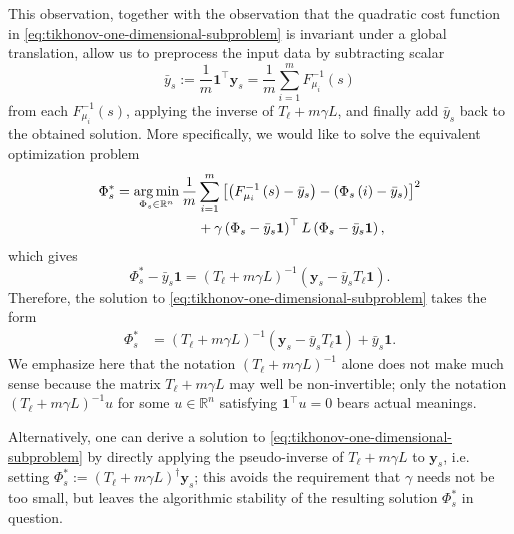 \documentclass[letterpaper]{article} %
\begin{document}
This observation, together with the observation that the quadratic cost function in \eqref{eq:tikhonov-one-dimensional-subproblem} is invariant under a global translation, allow us to preprocess the input data by subtracting scalar
\begin{equation}
  \label{eq:off-set-defn}
  \bar{y}_s := \frac{1}{m}\mathbf{1}^{\top}\mathbf{y}_s=\frac{1}{m}\sum_{i=1}^mF_{\mu_i}^{-1}\left( s \right)
\end{equation}
from each $F_{\mu_i}^{-1}\left( s \right)$, applying the inverse of $T_\ell+m\gamma L$, and finally add $\bar{y}_s$ back to the obtained solution. More specifically, we would like to solve the equivalent optimization problem
\begin{equation}
  \label{eq:tikhonov-one-dimensional-subproblem-equiv}
  \begin{aligned}
    \Phi_s^*=\mathop{\rm arg\, min}_{\Phi_s\in\mathbb{R}^n}\frac{1}{m}&\sum_{i=1}^m \left[\left( F_{\mu_i}^{-1}\left( s \right)-\bar{y}_s\right)-\left(\Phi_s \left( i \right)-\bar{y}_s \right)\right]^2\\
    &+\gamma \left(\Phi_s-\bar{y}_s\mathbf{1}\right)^{\top}L\left(\Phi_s-\bar{y}_s\mathbf{1}\right),
  \end{aligned}
\end{equation}
which gives
\begin{equation*}
  \Phi_s^*-\bar{y}_s\mathbf{1}=\left( T_{\ell}+m\gamma L \right)^{-1}\left(\mathbf{y}_s-\bar{y}_sT_\ell\mathbf{1}\right).
\end{equation*}
Therefore, the solution to \eqref{eq:tikhonov-one-dimensional-subproblem} takes the form
\begin{equation}
  \label{eq:sol-tikhonov-one-dimensional-subproblem}
  \begin{aligned}
    \Phi_s^{*}&=\left( T_{\ell}+m\gamma L \right)^{-1}\left(\mathbf{y}_s-\bar{y}_sT_\ell\mathbf{1}\right)+\bar{y}_s\mathbf{1}.
  \end{aligned}
\end{equation}
We emphasize here that the notation $\left( T_{\ell}+m\gamma L \right)^{-1}$ alone does not make much sense because the matrix $T_{\ell}+m\gamma L$ may well be non-invertible; only the notation $\left( T_{\ell}+m\gamma L \right)^{-1}u$ for some $u\in\mathbb{R}^n$ satisfying $\mathbf{1}^{\top}u=0$ bears actual meanings.
\begin{remark}
  Alternatively, one can derive a solution to \eqref{eq:tikhonov-one-dimensional-subproblem} by directly applying the pseudo-inverse of $T_{\ell}+m\gamma L$ to $\mathbf{y}_s$, i.e. setting $\Phi_s^{*}:=\left( T_{\ell}+m\gamma L \right)^{\dagger}\mathbf{y}_s$; this avoids the requirement that $\gamma$ needs not be too small, but leaves the algorithmic stability of the resulting solution $\Phi_s^{*}$ in question.
\end{remark}
\end{document}
